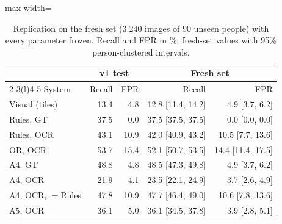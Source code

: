 \documentclass[12pt]{article}
\begin{document}
\begin{table}[H]
\caption{Replication on the fresh set (3{,}240 images of 90 unseen people) with every parameter frozen. Recall and FPR in \%; fresh-set values with 95\% person-clustered intervals.}
\label{tab:fresh}
\centering
\scriptsize
\setlength{\tabcolsep}{3pt}
\renewcommand{\arraystretch}{1.06}
\begin{adjustbox}{max width=\linewidth}
\begin{tabular}{@{}l r r r r@{}}
\toprule
 & \multicolumn{2}{c}{v1 test} & \multicolumn{2}{c}{Fresh set} \\ \cmidrule(lr){2-3}\cmidrule(l){4-5}
System & Recall & FPR & Recall & FPR \\
\midrule
Visual (tiles) & 13.4 & 4.8 & 12.8 {\tiny[11.4, 14.2]} & 4.9 {\tiny[3.7, 6.2]} \\
Rules, GT & 37.5 & 0.0 & 37.5 {\tiny[37.5, 37.5]} & 0.0 {\tiny[0.0, 0.0]} \\
Rules, OCR & 43.1 & 10.9 & 42.0 {\tiny[40.9, 43.2]} & 10.5 {\tiny[7.7, 13.6]} \\
OR, OCR & 53.7 & 15.4 & 52.1 {\tiny[50.7, 53.5]} & 14.4 {\tiny[11.4, 17.5]} \\
A4, GT & 48.8 & 4.8 & 48.5 {\tiny[47.3, 49.8]} & 4.9 {\tiny[3.7, 6.2]} \\
A4, OCR & 21.9 & 4.1 & 23.5 {\tiny[22.1, 24.9]} & 3.7 {\tiny[2.6, 4.9]} \\
A4, OCR, $=$Rules & 47.8 & 10.9 & 47.7 {\tiny[46.4, 49.0]} & 10.6 {\tiny[7.8, 13.6]} \\
A5, OCR & 36.1 & 5.0 & 36.1 {\tiny[34.5, 37.8]} & 3.9 {\tiny[2.8, 5.1]} \\
\bottomrule
\end{tabular}
\end{adjustbox}
\end{table}
\end{document}
